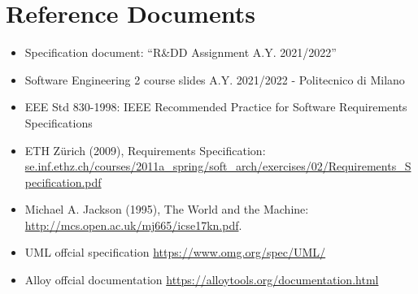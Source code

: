 \section{Reference Documents}

\begin{itemize}
    \item Specification document: “R\&DD Assignment A.Y. 2021/2022”
    \item Software Engineering 2 course slides A.Y. 2021/2022 - Politecnico di Milano
    \item EEE Std 830-1998: IEEE Recommended Practice for Software Requirements Specifications
    \item ETH Zürich (2009), Requirements Specification:\\ \url{se.inf.ethz.ch/courses/2011a_spring/soft_arch/exercises/02/Requirements_Specification.pdf} 
    \item Michael A. Jackson (1995), The World and the Machine: \url{http://mcs.open.ac.uk/mj665/icse17kn.pdf}.
    \item UML offcial specification \url{https://www.omg.org/spec/UML/}
    \item Alloy offcial documentation \url{https://alloytools.org/documentation.html}
\end{itemize}

\newpage